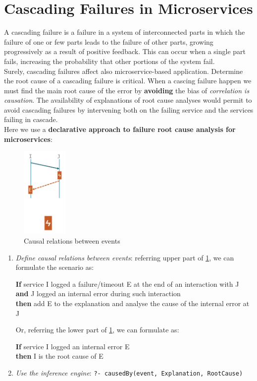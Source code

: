 \documentclass[10pt,a4paper]{report}
\begin{document}
\section{Cascading Failures in Microservices}
A cascading failure is a failure in a system of interconnected parts in which the failure of one or few parts leads to the failure of other parts, growing progressively as a result of positive feedback. This can occur when a single part fails, increasing the probability that other portions of the system fail.\\
Surely, cascading failures affect also microservice-based application. Determine the root cause of a cascading failure is critical. 
When a cascing failure happen we must find the main root cause of the error by \textbf{avoiding} the bias of \textit{correlation is causation}. 
The availability of explanations of root cause analyses would permit to avoid cascading failures by intervening both on the failing service and the services failing in cascade.\\
Here we use a \textbf{declarative approach to failure root cause analysis for microservices}:
\begin{figure}[h]
	\centering
	\includegraphics[width=0.2\textwidth]{image-root-cause}
	\caption{Causal relations between events}
	\label{image-root-cause}
\end{figure}
\begin{enumerate}
	\item \textit{Define causal relations between events}: referring upper part of \ref{image-root-cause}, we can formulate the scenario as:
	\begin{center}
		\textbf{If} service I logged a failure/timeout E at the end of an interaction with J\\
		\textbf{and} J logged an internal error during such interaction\\
		\textbf{then} add E to the explanation and analyse the cause of the internal error at J
	\end{center}
	Or, referring the lower part of \ref{image-root-cause}, we can formulate as:
	\begin{center}
		\textbf{If} service I logged an internal error E\\
		\textbf{then} I is the root cause of E
	\end{center}
	\item \textit{Use the inference engine}:  \texttt{?- causedBy(event, Explanation, RootCause)}

\end{enumerate}
\end{document}
